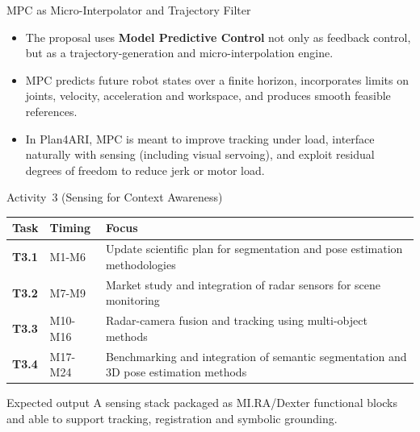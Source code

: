 \documentclass[aspectratio=169,10pt]{beamer}
\begin{document}
\begin{frame}{MPC as Micro-Interpolator and Trajectory Filter}

\begin{itemize}
  \item The proposal uses \textbf{Model Predictive Control} not only as feedback control, but as a trajectory-generation and micro-interpolation engine.
  \item MPC predicts future robot states over a finite horizon, incorporates limits on joints, velocity, acceleration and workspace, and produces smooth feasible references.
  \item In Plan4ARI, MPC is meant to improve tracking under load, interface naturally with sensing (including visual servoing), and exploit residual degrees of freedom to reduce jerk or motor load.
\end{itemize}

\end{frame}


\begin{frame}{Activity~3 (Sensing for Context Awareness)}

\small
\begin{tabularx}{\textwidth}{>{\bfseries}p{} p{} X}
\toprule
Task & Timing & Focus \\
\midrule
T3.1 & M1-M6 & Update scientific plan for segmentation and pose estimation methodologies \\
T3.2 & M7-M9 & Market study and integration of radar sensors for scene monitoring \\
T3.3 & M10-M16 & Radar-camera fusion and tracking using multi-object methods \\
T3.4 & M17-M24 & Benchmarking and integration of semantic segmentation and 3D pose estimation methods \\
\bottomrule
\end{tabularx}
\vspace{0.4em}
\begin{block}{Expected output}
A sensing stack packaged as MI.RA/Dexter functional blocks and able to support tracking, registration and symbolic grounding.
\end{block}

\end{frame}
\end{document}
